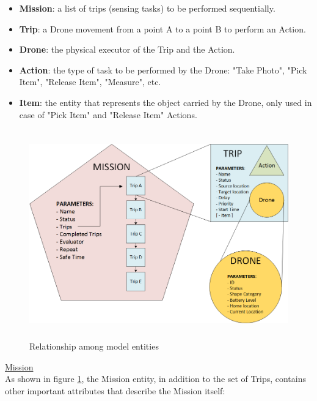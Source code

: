 \begin{itemize}
\itemsep2pt
\item{
\textbf{Mission}: a list of trips (sensing tasks) to be performed sequentially.
}
\item{
\textbf{Trip}: a Drone movement from a point A to a point B to perform an Action.
}
\item{
\textbf{Drone}: the physical executor of the Trip and the Action.
}
\item{
\textbf{Action}: the type of task to be performed by the Drone: "Take Photo", "Pick Item", "Release Item", "Measure", etc.
}
\item{
\textbf{Item}: the entity that represents the object carried by the Drone, only used in case of "Pick Item" and "Release Item" Actions.
}
\end{itemize}

\begin{figure}[h!]
  \centering
  \includegraphics[width=\linewidth, height=9cm]
  {pictures/EntityRelationship.png}
  \caption{Relationship among model entities}
  \label{fig:EntityRelationship}
\end{figure}

\underline{Mission}
\\

As shown in figure \ref{fig:EntityRelationship}, the Mission entity, in addition to the set of Trips, contains other important attributes that describe the Mission itself:

